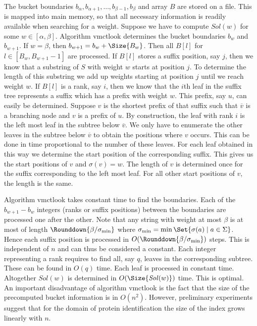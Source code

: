 \documentclass[12pt]{article}
\newcommand{\Vmctlook}[0]{{\small \textsf{vmctlook}}\xspace}
\newcommand{\Weight}[0]{w}
\newcommand{\Sol}[1]{\mathit{Sol}(\Weight)}
\begin{document}
The bucket boundaries \(b_{\alpha},b_{\alpha+1},\ldots,b_{\beta-1},b_{\beta}\)
and array \(B\) are stored on a file. This is mapped into main memory, so 
that all necessary information is readily available when searching for a 
weight. Suppose we have to compute \(\Sol{\Weight}\) for 
some \(\Weight\in[\alpha,\beta]\). Algorithm \Vmctlook determines
the bucket boundaries \(b_{\Weight}\) and \(b_{\Weight+1}\).
If \(\Weight=\beta\), then \(b_{\Weight+1}=b_{\Weight}+\Size{B_{\Weight}}\).
Then all \(B[l]\) for \(l\in[B_{\Weight},B_{\Weight+1}-1]\) are processed. If 
\(B[l]\) stores a suffix position, say \(j\), then we know that a 
substring of \(S\) with weight \(\Weight\) starts at position \(j\). 
To determine the length of this substring we add up weights starting at 
position \(j\) until we reach weight \(\Weight\).
If \(B[l]\) is a rank, say \(i\), then we know that the \(i\)th
leaf in the suffix tree represents a suffix which has a prefix with
weight \(\Weight\). This prefix, say \(u\), can easily be determined.
Suppose \(v\) is the shortest prefix of that suffix such that \(\overline{v}\)
is a branching node and \(v\) is a prefix of \(u\). By construction, the
leaf with rank \(i\) is the left most leaf in the subtree below 
\(\overline{v}\). We only have to enumerate the other leaves in the subtree 
below \(\overline{v}\) to obtain the positions where \(v\) occurs. This can be 
done in time proportional to the number of these leaves. For each leaf 
obtained in this way we determine the start position of the corresponding 
suffix. This gives us the start positions of \(v\) and \(\sigma(v)=\Weight\).
The length of \(v\) is determined once for the suffix corresponding to the 
left most leaf. For all other start positions of \(v\), the length is the same.

Algorithm \Vmctlook takes constant time to find the boundaries. Each of 
the \(b_{\Weight+1}-b_{\Weight}\) integers (ranks or suffix positions)
between the boundaries are processed one after the other.
Note that any string with weight at most \(\beta\) is at most of length 
\(\Rounddown{\beta/\sigma_{\min}}\)
where \(\sigma_{\min}=\min\Set{\sigma(a)\mid a\in\Sigma}\). Hence
each suffix position is processed in \(O(\Rounddown{\beta/\sigma_{\min}})\) 
steps. This is independent of \(n\) and can thus be considered a constant. Each 
integer representing a rank requires to find all, say \(q\), leaves in the
corresponding subtree. These can be found in \(O(q)\) time. Each leaf is 
processed in constant time. Altogether \(\Sol{\Weight}\) is
determined in \(O(\Size{\Sol{\Weight}})\) time. This is optimal.
An important disadvantage of algorithm \Vmctlook is the fact that the size of 
the precomputed bucket information is in \(O(n^{2})\). However, preliminary
experiments suggest that for the domain of protein identification the 
size of the index grows linearly with \(n\). 
\begin{comment}
For more details see
Section \ref{Experiments}.
\end{comment}
\end{document}
